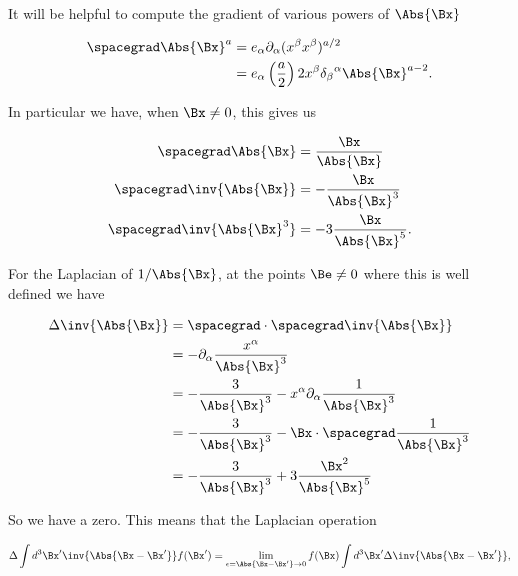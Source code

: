 It will be helpful to compute the gradient of various powers of $\Abs{\Bx}$

\begin{equation}\label{eqn:relativisticElectrodynamicsL18:780}
\begin{aligned}
\spacegrad \Abs{\Bx}^a
&=
e_\alpha \partial_\alpha (x^\beta x^\beta)^{a/2} \\
&=
e_\alpha \left(\frac{a}{2}\right) 2 x^\beta {\delta_\beta}^\alpha \Abs{\Bx}^{a - 2}.
\end{aligned}
\end{equation}

In particular we have, when $\Bx \ne 0$, this gives us

\begin{equation}\label{eqn:relativisticElectrodynamicsL18:135}
\begin{aligned}
\spacegrad \Abs{\Bx} &= \frac{\Bx}{\Abs{\Bx}} \\
\spacegrad \inv{\Abs{\Bx}} &= -\frac{\Bx}{\Abs{\Bx}^3} \\
\spacegrad \inv{\Abs{\Bx}^3} &= -3 \frac{\Bx}{\Abs{\Bx}^5}.
\end{aligned}
\end{equation}

For the Laplacian of $1/\Abs{\Bx}$, at the points $\Be \ne 0$ where this is well defined we have

\begin{equation}\label{eqn:relativisticElectrodynamicsL18:800}
\begin{aligned}
\Delta \inv{\Abs{\Bx}} 
&=
\spacegrad \cdot \spacegrad \inv{\Abs{\Bx}} \\
&= 
-\partial_\alpha \frac{x^\alpha}{\Abs{\Bx}^3} \\
&= 
-\frac{3}{\Abs{\Bx}^3} 
- x^\alpha \partial_\alpha \frac{1}{\Abs{\Bx}^3} \\
&= 
-\frac{3}{\Abs{\Bx}^3} 
- \Bx \cdot \spacegrad \frac{1}{\Abs{\Bx}^3} \\
&= 
-\frac{3}{\Abs{\Bx}^3} 
+ 3 \frac{\Bx^2}{\Abs{\Bx}^5}
\end{aligned}
\end{equation}

So we have a zero.  This means that the Laplacian operation 

\begin{equation}\label{eqn:relativisticElectrodynamicsL18:300}
\Delta \int d^3 \Bx' \inv{\Abs{\Bx - \Bx'} } f(\Bx') 
=
\lim_{\epsilon = \Abs{\Bx -\Bx'} \rightarrow 0}
f(\Bx) \int d^3 \Bx' \Delta \inv{\Abs{\Bx - \Bx'}},
\end{equation}

